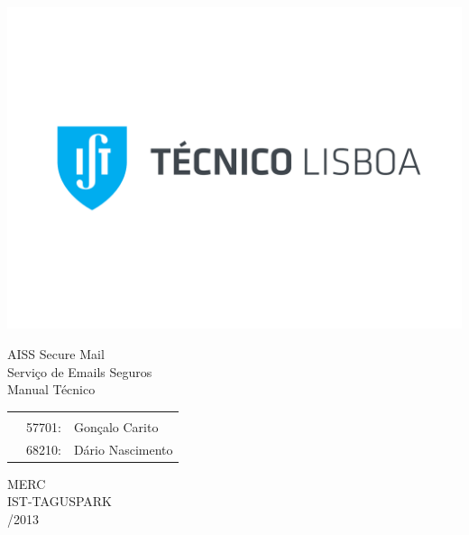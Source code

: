\thispagestyle {empty}

\includegraphics[bb=5.8cm 11cm 0cm 0cm,scale=0.38]{./Figures/IST_Logo}

\begin{center}
%

\vspace{6.5cm}
{\FontLb AISS Secure Mail} \\
{\FontLn Serviço de Emails Seguros} \\
\vspace{1.0cm}
{\FontLn Manual Técnico} \\
\vspace*{1.0cm}
\begin{center}
\begin{tabular}{r@{~}l l}
    \multicolumn{3}{c}{\bfseries\textbf{ }} \\
    & 57701: & Gonçalo Carito \\
    & 68210: & Dário Nascimento \\
\end{tabular}
\end{center}
\vspace*{2.5cm}
{\FontLb MERC} \\
{\FontLb IST-TAGUSPARK} \\

\vspace{1.5cm}
{/2013} \\
%
\end{center}

\cleardoublepage

